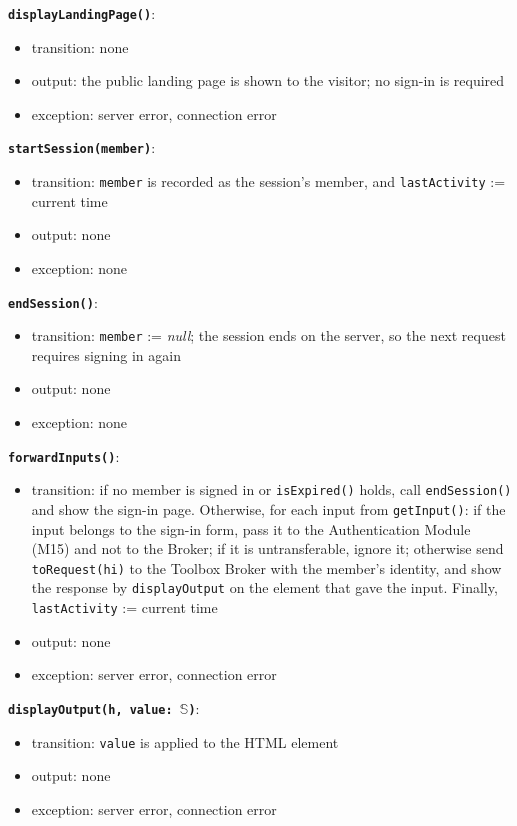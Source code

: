 \documentclass[12pt, titlepage]{article}
\begin{document}
\textbf{\texttt{displayLandingPage()}}:
\begin{itemize}
  \item transition: none
  \item output: the public landing page is shown to the visitor; no sign-in is required
  \item exception: server error, connection error
\end{itemize}

\textbf{\texttt{startSession(member)}}:
\begin{itemize}
  \item transition: \texttt{member} is recorded as the session's member, and \texttt{lastActivity} := current time
  \item output: none
  \item exception: none
\end{itemize}

\textbf{\texttt{endSession()}}:
\begin{itemize}
  \item transition: \texttt{member} := \textit{null}; the session ends on the server, so the next request requires signing in again
  \item output: none
  \item exception: none
\end{itemize}

\textbf{\texttt{forwardInputs()}}:
\begin{itemize}
  \item transition: if no member is signed in or \texttt{isExpired()} holds, call \texttt{endSession()} and show the sign-in page. Otherwise, for each input from \texttt{getInput()}: if the input belongs to the sign-in form, pass it to the Authentication Module (M15) and not to the Broker; if it is untransferable, ignore it; otherwise send \texttt{toRequest(hi)} to the Toolbox Broker with the member's identity, and show the response by \texttt{displayOutput} on the element that gave the input. Finally, \texttt{lastActivity} := current time
  \item output: none
  \item exception: server error, connection error
\end{itemize}

\textbf{\texttt{displayOutput(h, value: $\mathbb{S}$)}}:
\begin{itemize}
  \item transition: \texttt{value} is applied to the HTML element
  \item output: none
  \item exception: server error, connection error
\end{itemize}
\end{document}
